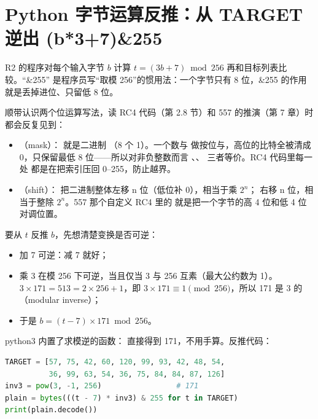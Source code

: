 \documentclass[UTF8,12pt,oneside]{ctexbook}
\begin{document}

\section{Python 字节运算反推：从 TARGET 逆出 (b*3+7)\&255}
R2 的程序对每个输入字节 $b$ 计算 $t = (3b + 7) \bmod 256$ 再和目标列表比较。“\&255” 是程序员写“取模 256”的惯用法：一个字节只有 8 位，\&255 的作用就是丢掉进位、只留低 8 位。

顺带认识两个位运算写法，读 RC4 代码（第 2.8 节）和 557 的推演（第 7 章）时都会反复见到：
\begin{itemize}
\item {}（mask）： 就是二进制 （8 个 1）。一个数与  做按位与，高位的比特全被清成 0，只保留最低 8 位——所以对非负整数而言 、、 三者等价。RC4 代码里每一处  都是在把索引压回 0--255，防止越界。
\item {}（shift）： 把二进制整体左移 n 位（低位补 0），相当于乘 $2^n$； 右移 n 位，相当于整除 $2^n$。557 那个自定义 RC4 里的  就是把一个字节的高 4 位和低 4 位对调位置。
\end{itemize}

要从 $t$ 反推 $b$，先想清楚变换是否可逆：
\begin{itemize}
\item 加 7 可逆：减 7 就好；
\item 乘 3 在模 256 下可逆，当且仅当 3 与 256 互素（最大公约数为 1）。$3\times 171 = 513 = 2\times256 + 1$，即 $3\times171\equiv 1 \pmod{256}$，所以 171 是 3 的（modular inverse）；
\item 于是 $b = (t - 7)\times 171 \bmod 256$。
\end{itemize}
python3 内置了求模逆的函数： 直接得到 171，不用手算。反推代码：
\begin{lstlisting}[language=Python]
TARGET = [57, 75, 42, 60, 120, 99, 93, 42, 48, 54,
          36, 99, 63, 54, 36, 75, 84, 84, 87, 126]
inv3 = pow(3, -1, 256)                 # 171
plain = bytes(((t - 7) * inv3) & 255 for t in TARGET)
print(plain.decode())
\end{lstlisting}

\end{document}
